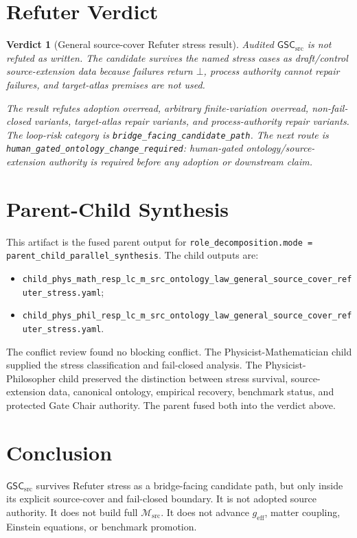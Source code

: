 \documentclass[11pt]{article}
\newcommand{\Msrc}{\mathcal{M}_{\mathrm{src}}}
\newcommand{\geff}{g_{\mathrm{eff}}}
\newcommand{\GSC}{\mathsf{GSC}_{\mathrm{src}}}
\newcommand{\Bot}{\bot}
\newtheorem{verdict}{Verdict}
\begin{document}
\section{Refuter Verdict}

\begin{verdict}[General source-cover Refuter stress result]
Audited \(\GSC\) is not refuted as written. The candidate survives the named
stress cases as draft/control source-extension data because failures return
\(\Bot\), process authority cannot repair failures, and target-atlas premises
are not used.

The result refutes adoption overread, arbitrary finite-variation overread,
non-fail-closed variants, target-atlas repair variants, and process-authority
repair variants. The loop-risk category is
\texttt{bridge\_facing\_candidate\_path}. The next route is
\texttt{human\_gated\_ontology\_change\_required}: human-gated
ontology/source-extension authority is required before any adoption or
downstream claim.
\end{verdict}

\section{Parent-Child Synthesis}

This artifact is the fused parent output for
\texttt{role\_decomposition.mode = parent\_child\_parallel\_synthesis}. The
child outputs are:
\begin{itemize}
  \item \texttt{child\_phys\_math\_resp\_lc\_m\_src\_ontology\_law\_general\_source\_cover\_refuter\_stress.yaml};
  \item \texttt{child\_phys\_phil\_resp\_lc\_m\_src\_ontology\_law\_general\_source\_cover\_refuter\_stress.yaml}.
\end{itemize}
The conflict review found no blocking conflict. The
Physicist-Mathematician child supplied the stress classification and
fail-closed analysis. The Physicist-Philosopher child preserved the
distinction between stress survival, source-extension data, canonical
ontology, empirical recovery, benchmark status, and protected Gate Chair
authority. The parent fused both into the verdict above.

\section{Conclusion}

\(\GSC\) survives Refuter stress as a bridge-facing candidate path, but only
inside its explicit source-cover and fail-closed boundary. It is not adopted
source authority. It does not build full \(\Msrc\). It does not advance
\(\geff\), matter coupling, Einstein equations, or benchmark promotion.
\end{document}

